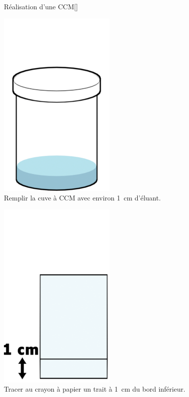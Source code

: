 \begin{doc}{Réalisation d'une CCM}[\label{doc:protocole_CCM}]
  \begin{multicols}{3}
    \begin{center}
      \includegraphics[height=0.2\textheight]{images/chimie/CCM/CCM_protocole0001.png} \\      
      Remplir la cuve à CCM avec environ \qty{1}{\cm} d'éluant.
    \end{center} 
    
    \begin{center}
      \includegraphics[height=0.2\textheight]{images/chimie/CCM/CCM_protocole0002.png} \\      
      Tracer au crayon à papier un trait à \qty{1}{\cm} du bord inférieur.
    \end{center}
  

\end{multicols}
\end{doc}
